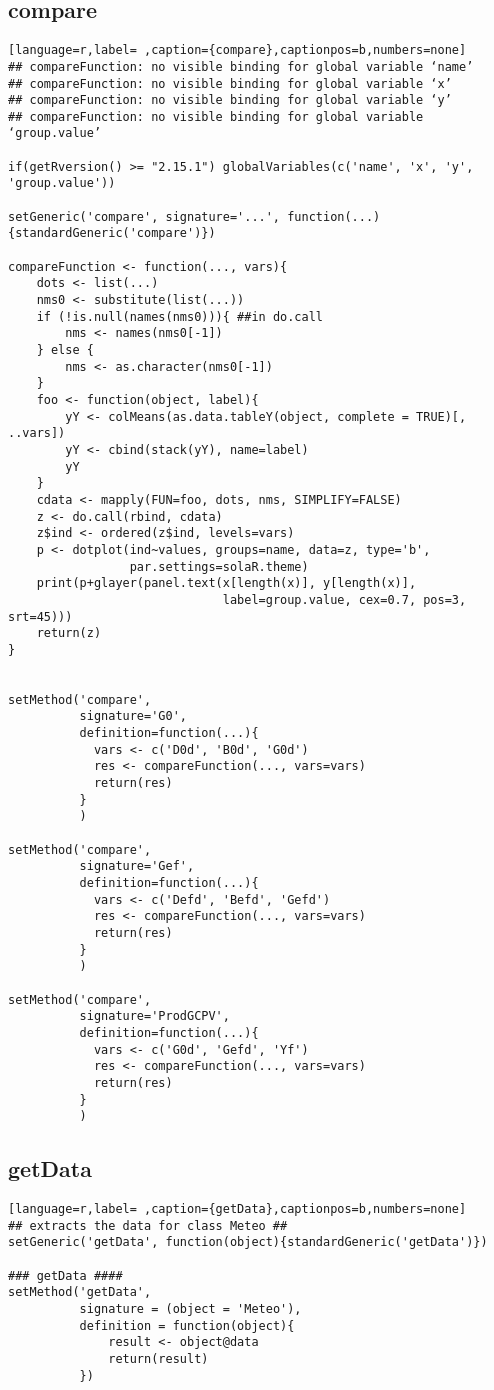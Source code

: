 \subsection{compare}
\label{sec:org4e86571}
\label{subsec:compare}
\begin{lstlisting}[language=r,label= ,caption={compare},captionpos=b,numbers=none]
## compareFunction: no visible binding for global variable ‘name’
## compareFunction: no visible binding for global variable ‘x’
## compareFunction: no visible binding for global variable ‘y’
## compareFunction: no visible binding for global variable ‘group.value’

if(getRversion() >= "2.15.1") globalVariables(c('name', 'x', 'y', 'group.value'))

setGeneric('compare', signature='...', function(...){standardGeneric('compare')})

compareFunction <- function(..., vars){
    dots <- list(...)
    nms0 <- substitute(list(...))
    if (!is.null(names(nms0))){ ##in do.call
        nms <- names(nms0[-1])
    } else {
        nms <- as.character(nms0[-1])
    }
    foo <- function(object, label){
        yY <- colMeans(as.data.tableY(object, complete = TRUE)[, ..vars])
        yY <- cbind(stack(yY), name=label)
        yY
    }
    cdata <- mapply(FUN=foo, dots, nms, SIMPLIFY=FALSE)
    z <- do.call(rbind, cdata)
    z$ind <- ordered(z$ind, levels=vars)
    p <- dotplot(ind~values, groups=name, data=z, type='b',
                 par.settings=solaR.theme)
    print(p+glayer(panel.text(x[length(x)], y[length(x)],
                              label=group.value, cex=0.7, pos=3, srt=45)))
    return(z)
}


setMethod('compare',
          signature='G0',
          definition=function(...){
            vars <- c('D0d', 'B0d', 'G0d')
            res <- compareFunction(..., vars=vars)
            return(res)
          }
          )

setMethod('compare',
          signature='Gef',
          definition=function(...){
            vars <- c('Defd', 'Befd', 'Gefd')
            res <- compareFunction(..., vars=vars)
            return(res)
          }
          )

setMethod('compare',
          signature='ProdGCPV',
          definition=function(...){
            vars <- c('G0d', 'Gefd', 'Yf')
            res <- compareFunction(..., vars=vars)
            return(res)
          }
          )
\end{lstlisting}
\subsection{getData}
\label{sec:orgd57f26d}
\label{subsec:getData}
\begin{lstlisting}[language=r,label= ,caption={getData},captionpos=b,numbers=none]
## extracts the data for class Meteo ##
setGeneric('getData', function(object){standardGeneric('getData')})

### getData ####
setMethod('getData',
          signature = (object = 'Meteo'),
          definition = function(object){
              result <- object@data
              return(result)
          })
\end{lstlisting}
